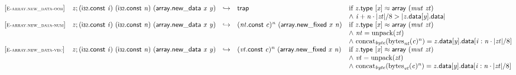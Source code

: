 $$
\begin{array}{@{}l@{}lcl@{}l@{}}
{[\textsc{\scriptsize E{-}array.new\_data{-}oob}]} \quad & {\mathit{z}} ; (\mathsf{i{\scriptstyle32}}.\mathsf{const}~{\mathit{i}})~(\mathsf{i{\scriptstyle32}}.\mathsf{const}~{\mathit{n}})~(\mathsf{array.new\_data}~{\mathit{x}}~{\mathit{y}}) &\hookrightarrow& \mathsf{trap} &\quad
  \mbox{if}~{\mathit{z}}.\mathsf{type}~{}[{\mathit{x}}] \approx \mathsf{array}~({\mathit{mut}}~{\mathit{zt}}) \\
 &&&&\quad {\land}~{\mathit{i}} + {\mathit{n}} \cdot {|{\mathit{zt}}|} / 8 > {|{{\mathit{z}}.\mathsf{data}}{{}[{\mathit{y}}]}.\mathsf{data}|} \\
{[\textsc{\scriptsize E{-}array.new\_data{-}num}]} \quad & {\mathit{z}} ; (\mathsf{i{\scriptstyle32}}.\mathsf{const}~{\mathit{i}})~(\mathsf{i{\scriptstyle32}}.\mathsf{const}~{\mathit{n}})~(\mathsf{array.new\_data}~{\mathit{x}}~{\mathit{y}}) &\hookrightarrow& {({\mathit{nt}}.\mathsf{const}~{\mathit{c}})^{{\mathit{n}}}}~(\mathsf{array.new\_fixed}~{\mathit{x}}~{\mathit{n}}) &\quad
  \mbox{if}~{\mathit{z}}.\mathsf{type}~{}[{\mathit{x}}] \approx \mathsf{array}~({\mathit{mut}}~{\mathit{zt}}) \\
 &&&&\quad {\land}~{\mathit{nt}} = {\mathrm{unpack}}({\mathit{zt}}) \\
 &&&&\quad {\land}~{{\mathrm{concat}}}_{{\mathit{byte}}}({{{\mathrm{bytes}}}_{{\mathit{nt}}}({\mathit{c}})^{{\mathit{n}}}}) = {{\mathit{z}}.\mathsf{data}}{{}[{\mathit{y}}]}.\mathsf{data}{}[{\mathit{i}} : {\mathit{n}} \cdot {|{\mathit{zt}}|} / 8] \\
{[\textsc{\scriptsize E{-}array.new\_data{-}vec}]} \quad & {\mathit{z}} ; (\mathsf{i{\scriptstyle32}}.\mathsf{const}~{\mathit{i}})~(\mathsf{i{\scriptstyle32}}.\mathsf{const}~{\mathit{n}})~(\mathsf{array.new\_data}~{\mathit{x}}~{\mathit{y}}) &\hookrightarrow& {({\mathit{vt}}.\mathsf{const}~{\mathit{c}})^{{\mathit{n}}}}~(\mathsf{array.new\_fixed}~{\mathit{x}}~{\mathit{n}}) &\quad
  \mbox{if}~{\mathit{z}}.\mathsf{type}~{}[{\mathit{x}}] \approx \mathsf{array}~({\mathit{mut}}~{\mathit{zt}}) \\
 &&&&\quad {\land}~{\mathit{vt}} = {\mathrm{unpack}}({\mathit{zt}}) \\
 &&&&\quad {\land}~{{\mathrm{concat}}}_{{\mathit{byte}}}({{{\mathrm{bytes}}}_{{\mathit{vt}}}({\mathit{c}})^{{\mathit{n}}}}) = {{\mathit{z}}.\mathsf{data}}{{}[{\mathit{y}}]}.\mathsf{data}{}[{\mathit{i}} : {\mathit{n}} \cdot {|{\mathit{zt}}|} / 8] \\
\end{array}
$$

